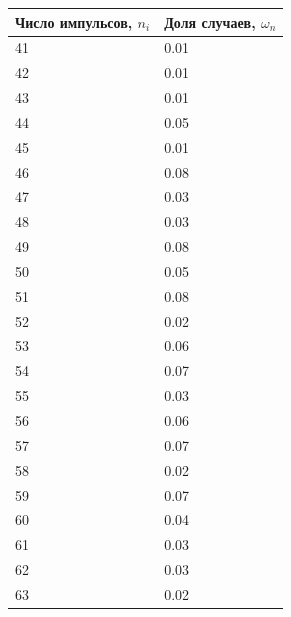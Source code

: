 \documentclass[a4paper]{article}
\begin{document}
\begin{table}[!h]
\begin{center}
\begin{tabular}{|l|l|}
\hline
Число импульсов, $n_{i}$ & Доля случаев, $\omega_{n}$ \\\hline
41                       & 0.01                       \\\hline
42                       & 0.01                       \\\hline
43                       & 0.01                       \\\hline
44                       & 0.05                       \\\hline
45                       & 0.01                       \\\hline
46                       & 0.08                       \\\hline
47                       & 0.03                       \\\hline
48                       & 0.03                       \\\hline
49                       & 0.08                       \\\hline
50                       & 0.05                       \\\hline
51                       & 0.08                       \\\hline
52                       & 0.02                       \\\hline
53                       & 0.06                       \\\hline
54                       & 0.07                       \\\hline
55                       & 0.03                       \\\hline
56                       & 0.06                       \\\hline
57                       & 0.07                       \\\hline
58                       & 0.02                       \\\hline
59                       & 0.07                       \\\hline
60                       & 0.04                       \\\hline
61                       & 0.03                       \\\hline
62                       & 0.03                       \\\hline
63                       & 0.02                       \\\hline

\end{tabular}
\end{center}
\end{table}
\end{document}
